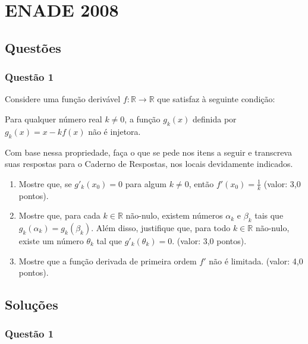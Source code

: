 \documentclass{report}
\begin{document}
\chapter{ENADE 2008}

\section{\color{blue} Quest\~oes}

\subsection{\color{blue} Quest\~ao 1}

Considere uma fun\c c\~ao deriv\'avel $f: \mathbb{R} \to \mathbb{R}$ que satisfaz \`a seguinte condi\c c\~ao:

Para qualquer n\'umero real $k\neq 0$, a fun\c c\~ao $g_k (x)$ definida por $g_k (x)=x-kf(x)$ n\~ao \'e injetora.

Com base nessa propriedade, fa\c ca o que se pede nos itens a seguir e transcreva suas respostas para o Caderno de Respostas, nos locais devidamente indicados.

\begin{enumerate}

\item[(a)] Mostre que, se $g'_k(x_0)=0$ para algum $k\neq 0$, ent\~ao $f' (x_0)=\frac1{k}$ (valor: 3,0 pontos).

\item[(b)] Mostre que, para cada $k \in \mathbb{R}$ n\~ao-nulo, existem n\'umeros $\alpha_k$ e $\beta_k$ tais que $g_k(\alpha_k) = g_k(\beta_k)$. Al\'em disso, justifique que, para todo $k \in \mathbb{R}$ n\~ao-nulo, existe um n\'umero $\theta_k$ tal que $g'_k(\theta_k)=0$. (valor: 3,0 pontos).

\item[(c)] Mostre que a fun\c c\~ao derivada de primeira ordem $f'$ n\~ao \'e limitada. (valor: 4,0 pontos).

\end{enumerate}

\section{\color{red} Solu\c c\~oes}

\subsection{\color{red} Quest\~ao 1}
\end{document}
